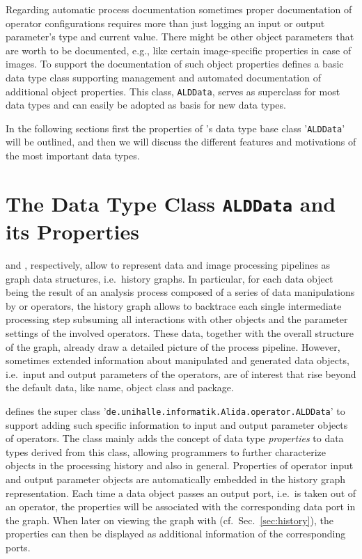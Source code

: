 Regarding automatic process documentation sometimes proper
documentation of operator configurations requires more than just logging an
input or output parameter's type and current value. There might be other object
parameters that are worth to be documented, e.g., like certain image-specific properties in case of
images. To support the documentation of such object properties \alida defines a basic data type class supporting management and
automated documentation of additional object properties. This class, {\tt ALDData}, 
serves as superclass for most \mitobo data types and can easily be adopted as basis for new data types. 

In the following sections first the properties of \alida's data type base class 
'{\tt ALDData}' will be outlined, and then we will discuss the different features and motivations 
of the most important \mitobo data types. 

\section{The Data Type Class {\tt ALDData} and its Properties}
\alida and \mitobo, respectively, allow to represent data and image processing pipelines as graph data structures, i.e.~history graphs. 
In particular, for each data object being the result of an analysis process composed of a series of data manipulations by \alida or
\mitobo operators,
the history graph allows to backtrace each single intermediate processing step subsuming all interactions with other
objects and the parameter settings of the involved operators. These data, together with the overall structure of the graph, already
draw a detailed picture of the process pipeline. However, sometimes extended information about manipulated and generated data
objects, i.e.~input and output parameters of the operators, are of interest that rise beyond the default data, like name, object
class and package. 

\alida defines the super class '{\tt de.unihalle.informatik.Alida.operator.ALDData}' to support
adding such specific information to input and output parameter objects of operators. The
class mainly adds the concept of data type {\em properties} to data types
derived from this class, allowing programmers to further characterize
objects in the processing history and also in general. Properties of
operator input and output parameter objects are automatically embedded in the history graph representation. 
Each time a data object passes an output port, i.e.~is taken out of an operator, 
the properties will be associated with the corresponding data port in the
graph. When later on viewing the graph with \mtbc (cf.~Sec.~\ref{sec:history}), the properties can then be
displayed as additional information of the corresponding ports. 


